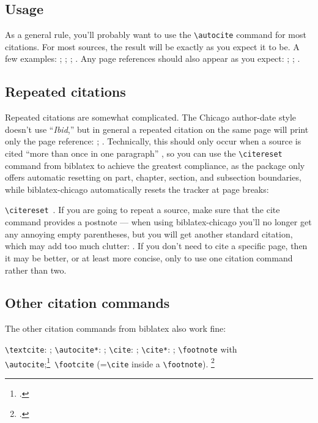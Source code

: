 \documentclass[a4paper,12pt]{report}
\newcommand{\cmd}[1]{\texttt{\textbackslash #1}}
\begin{document}
\subsection*{Usage}
\label{usage}

As a general rule, you'll probably want to use the \cmd{autocite}
command for most citations.  For most sources, the result will be
exactly as you expect it to be.  A few examples:
\autocite{adorno:benj}; \autocite{ashbrook:brain};
\autocite{babb:peru}; \autocite{barcott:review:15}.  Any page
references should also appear as you expect: \autocite[338]{batson};
\autocite[79]{beattie:crime}; \autocite[36]{boxer:china}.

\subsection*{Repeated citations}
\label{sec:ibidem}

Repeated citations are somewhat complicated.  The Chicago author-date
style doesn't use \enquote{\emph{Ibid},} but in general a repeated
citation on the same page will print only the page reference:
\autocite{browning:aurora}; \autocite[45]{browning:aurora}.
Technically, this should only occur when a source is cited
\enquote{more than once in one paragraph}
\autocite[15.26]{chicago:manual}, so you can use the \cmd{citereset}
command from \textsf{biblatex} to achieve the greatest compliance, as
the package only offers automatic resetting on part, chapter, section,
and subsection boundaries, while \textsf{biblatex-chicago}
automatically resets the tracker at page breaks:

\citereset\cmd{citereset}\ \autocite[15.27]{chicago:manual}.  If you
are going to repeat a source, make sure that the cite command provides
a postnote --- when using \textsf{biblatex-chicago} you'll no longer
get any annoying empty parentheses, but you will get another standard
citation, which may add too much clutter: \autocite{chicago:manual}.
If you don't need to cite a specific page, then it may be better, or
at least more concise, only to use one citation command rather than
two.

\subsection*{Other citation commands}
\label{sec:other}

The other citation commands from \textsf{biblatex} also work fine:

\cmd{textcite}: \textcite{conley:fifthgrade}; \cmd{autocite*}:
\autocite*{connell:chronic}; \cmd{cite}: \cite{conway:evolution};
\cmd{cite*}: \cite*{davenport:attention}; \cmd{foot\-note} with
\cmd{autocite};\footnote{\autocite{donne:var:15}.}\ \cmd{footcite}
(=\cmd{cite} inside a \cmd{footnote}).  \footcite{dunn:revolutions}
\end{document}
